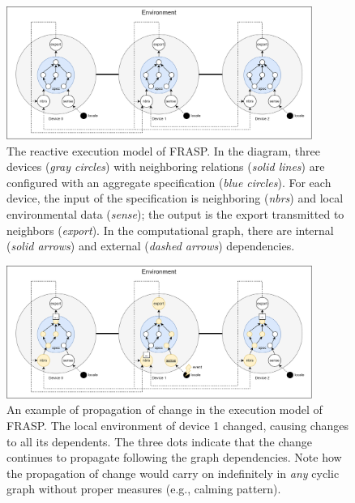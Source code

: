 \begin{figure}[!ht]
  \centering
  \includegraphics[width=0.89\textwidth]{resources/figures/frasp-simulation.png}
  \caption[The reactive execution model of FRASP]{
    The reactive execution model of FRASP. In the diagram, three
    devices (\textit{gray circles}) with neighboring relations (\textit{solid
      lines}) are configured with an aggregate specification (\textit{blue
      circles}). For each device, the input of the specification is
    neighboring (\textit{nbrs}) and local environmental data (\textit{sense});
    the output is the export transmitted to neighbors (\textit{export}). In the
    computational graph, there are internal (\textit{solid arrows}) and
    external (\textit{dashed arrows}) dependencies.
  }
  \label{figure:frasp-simulation}
\end{figure}

\begin{figure}[!ht]
  \centering
  \includegraphics[width=0.89\textwidth]{resources/figures/frasp-simulation-example.png}
  \caption[A propagation of change in the reactive execution model of FRASP]{
    An example of propagation of change in the execution model of FRASP. The
    local environment of device 1 changed, causing changes to all its
    dependents. The three dots indicate that the change continues to
    propagate following the graph dependencies. Note how the
    propagation of change would carry on indefinitely in \textit{any} cyclic
    graph without proper measures (e.g., calming pattern).
  }
  \label{figure:frasp-simulation-example}
\end{figure}

